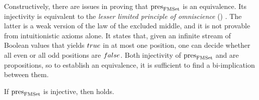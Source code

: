 \documentclass[final,a4paper,USenglish,cleveref]{lipics-v2021}
\begin{document}
Constructively, there are issues in proving that $\pres{\FMSet}$ is an equivalence. Its injectivity is equivalent to the \emph{lesser limited principle of omniscience} (\LLPO{}) \cite[{Ch.\@ 1}]{Bridges1987}. The latter is a weak version of the law of the excluded middle, and it is not provable from intuitionistic axioms alone.  It states that, given an infinite stream of Boolean
values that yields $\True$ in at most one position, one can decide
whether all even or all odd positions are $\False$.
Both injectivity of $\pres{\FMSet}$ and \LLPO{} are propositions, so to establish an equivalence, it is sufficient to find a bi-implication between them.

\begin{theorem}\label{lem:InjPresImpliesComplete}
  If $\pres{\FMSet}$ is injective, then \LLPO{} holds.
\end{theorem}
\end{document}

